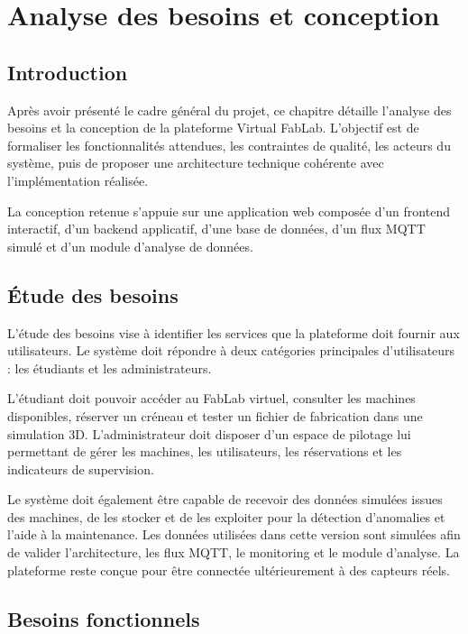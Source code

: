 \chapter{Analyse des besoins et conception}

\section{Introduction}

Après avoir présenté le cadre général du projet, ce chapitre détaille l’analyse des besoins et la conception de la plateforme Virtual FabLab. L’objectif est de formaliser les fonctionnalités attendues, les contraintes de qualité, les acteurs du système, puis de proposer une architecture technique cohérente avec l’implémentation réalisée.

La conception retenue s’appuie sur une application web composée d’un frontend interactif, d’un backend applicatif, d’une base de données, d’un flux MQTT simulé et d’un module d’analyse de données.

\section{Étude des besoins}

L’étude des besoins vise à identifier les services que la plateforme doit fournir aux utilisateurs. Le système doit répondre à deux catégories principales d’utilisateurs : les étudiants et les administrateurs.

L’étudiant doit pouvoir accéder au FabLab virtuel, consulter les machines disponibles, réserver un créneau et tester un fichier de fabrication dans une simulation 3D. L’administrateur doit disposer d’un espace de pilotage lui permettant de gérer les machines, les utilisateurs, les réservations et les indicateurs de supervision.

Le système doit également être capable de recevoir des données simulées issues des machines, de les stocker et de les exploiter pour la détection d’anomalies et l’aide à la maintenance. Les données utilisées dans cette version sont simulées afin de valider l’architecture, les flux MQTT, le monitoring et le module d’analyse. La plateforme reste conçue pour être connectée ultérieurement à des capteurs réels.

\section{Besoins fonctionnels}

